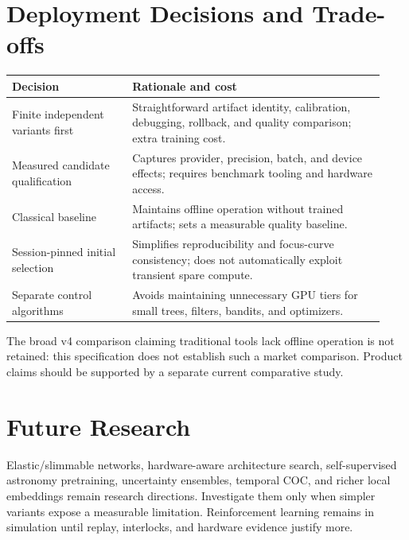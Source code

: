 \documentclass[11pt,a4paper]{article}
\begin{document}
\section{Deployment Decisions and Trade-offs}
\begin{longtable}{@{}L{0.30\linewidth}L{0.63\linewidth}@{}}
\toprule Decision & Rationale and cost\\\midrule\endhead
Finite independent variants first & Straightforward artifact identity,
calibration, debugging, rollback, and quality comparison; extra training cost.\\
Measured candidate qualification & Captures provider, precision, batch, and
device effects; requires benchmark tooling and hardware access.\\
Classical baseline & Maintains offline operation without trained artifacts;
sets a measurable quality baseline.\\
Session-pinned initial selection & Simplifies reproducibility and focus-curve
consistency; does not automatically exploit transient spare compute.\\
Separate control algorithms & Avoids maintaining unnecessary GPU tiers for
small trees, filters, bandits, and optimizers.\\
\bottomrule
\end{longtable}
The broad v4 comparison claiming traditional tools lack offline operation is
not retained: this specification does not establish such a market comparison.
Product claims should be supported by a separate current comparative study.

\section{Future Research}
Elastic/slimmable networks, hardware-aware architecture search, self-supervised
astronomy pretraining, uncertainty ensembles, temporal COC, and richer local
embeddings remain research directions. Investigate them only when simpler
variants expose a measurable limitation. Reinforcement learning remains in
simulation until replay, interlocks, and hardware evidence justify more.
\end{document}

